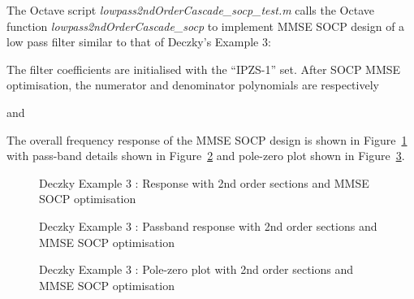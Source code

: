 \documentclass[a4paper,twoside,10pt,english]{report}
\begin{document}
The Octave script \emph{lowpass2ndOrderCascade\_socp\_test.m} calls the Octave 
function \emph{lowpass2ndOrderCascade\_socp} to implement MMSE SOCP design of
a low pass filter similar to that of Deczky's Example 3:
\begin{small}

\end{small}
The filter coefficients are initialised with the ``IPZS-1'' set.
After SOCP MMSE optimisation, the numerator and denominator polynomials are 
respectively
\begin{small}

\end{small}
and
\begin{small}

\end{small}
The overall frequency response of the MMSE SOCP design is shown in
Figure~\ref{fig:Deczky-Example-3-2ndOrder-MMSE-SOCP-x1} with pass-band details
shown in Figure~\ref{fig:Deczky-Example-3-2ndOrder-MMSE-SOCP-x1-passband} and 
pole-zero plot shown in
Figure~\ref{fig:Deczky-Example-3-2ndOrder-MMSE-SOCP-x1-pz}.
\begin{figure}[!htbp]
\begin{center}
\scalebox{0.7}{}
\caption{Deczky Example 3 : Response with 2nd order sections and MMSE SOCP optimisation}
\label{fig:Deczky-Example-3-2ndOrder-MMSE-SOCP-x1}
\end{center}
\end{figure}
\begin{figure}[!htbp]
\begin{center}
\scalebox{0.7}{}
\caption{Deczky Example 3 : Passband response with 2nd order sections and MMSE SOCP optimisation}
\label{fig:Deczky-Example-3-2ndOrder-MMSE-SOCP-x1-passband}
\end{center}
\end{figure}
\begin{figure}[!htbp]
\begin{center}
\scalebox{0.7}{}
\caption{Deczky Example 3 : Pole-zero plot with 2nd order sections and MMSE SOCP optimisation}
\label{fig:Deczky-Example-3-2ndOrder-MMSE-SOCP-x1-pz}
\end{center}
\end{figure}
\end{document}
